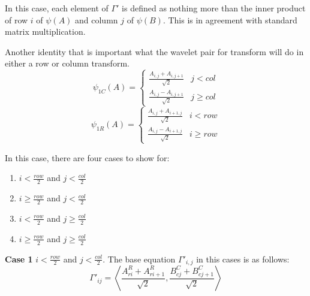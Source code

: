In this case, each element of $\Gamma'$ is defined as nothing more than the inner product of row $i$ of $\psi(A)$ and column $j$ of $\psi(B)$.  This is in agreement with standard matrix multiplication.  %
%

Another identity that is important what the wavelet pair for transform will do in either a row or column transform.  
\[  \psi _{1C} (A) = \left\{ 
\begin{array}{ll}
\frac{A_{i,j}+A_{i,j+1}}{\sqrt{2}} & j<col \\ 
\frac{A_{i,j}-A_{i,j+1}}{\sqrt{2}} & j\geq col%
\end{array}
\right.   \]
 \[  \psi _{1R} (A) = \left\{ 
\begin{array}{ll}
\frac{A_{i,j}+A_{i+1,j}}{\sqrt{2}} & i<row \\ 
\frac{A_{i,j}-A_{i+1,j}}{\sqrt{2}} & i\geq row%
\end{array}
\right. 
 \]
 
In this case, there are four cases to show for:
\begin{enumerate}
\item $i < \frac{row}{2}$ and $j <  \frac{col}{2}$
\item $i \geq \frac{row}{2}$ and $j <  \frac{col}{2}$
\item $i < \frac{row}{2}$ and $j \geq  \frac{col}{2}$
\item $i \geq \frac{row}{2}$ and $j \geq  \frac{col}{2}$
\end{enumerate}

 \textbf{Case 1} $i < \frac{row}{2} $ and $j < \frac{col}{2}$.
The base equation $\Gamma'_{i,j}$ in this cases is as follows:
\begin{equation}
\label{case1inner}
 \Gamma'_{ij} = \left\langle \frac {A^R_{ri} + A^R_{ri+1}}{\sqrt{2}} , \frac {B^C_{cj} + B^C_{cj + 1}}{\sqrt{2}} \right\rangle
\end{equation}

